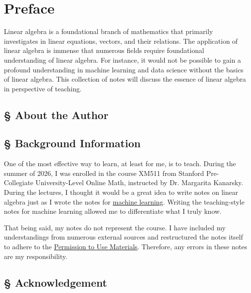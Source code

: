 \documentclass[../main.tex]{subfiles}
\begin{document}
\chapter*{Preface}

Linear algebra is a foundational branch of mathematics that
primarily investigates in linear equations, vectors, and their
relations. The application of linear algebra is immense that
numerous fields require foundational understanding of linear
algebra. For instance, it would not be possible to gain a
profound understanding in machine learning and data science
without the basics of linear algebra. This collection of notes
will discuss the essence of linear algebra in perspective of
teaching.


\section*{\S\! About the Author}

\section*{\S\! Background Information}

One of the most effective way to learn, at least for me, is to
teach. During the summer of 2026, I was enrolled in the course
XM511 from Stanford Pre-Collegiate University-Level Online Math,
instructed by Dr. Margarita Kanarsky. During the lectures,
I thought it would be a great idea to write notes on linear
algebra just as I wrote the notes for \href{null}{machine learning}.
Writing the teaching-style notes for machine learning allowed
me to differentiate what I truly know.

That being said, my notes do not represent the course. I have
included my understandings from numerous external sources and
restructured the notes itself to adhere to the
\href{https://www.stanford.edu/site/terms/}{Permission to Use
Materials}. Therefore, any errors in these notes are my
responsibility.


\section*{\S\! Acknowledgement}
\end{document}

